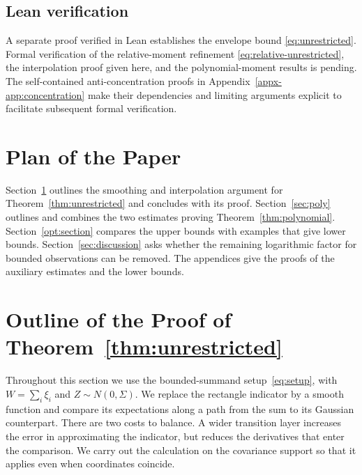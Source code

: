 \documentclass[11pt,letterpaper]{article}
\theoremstyle{remark}
\begin{document}
\subsection{Lean verification}\label{sec:lean-introduction}
A separate proof verified in Lean establishes the envelope bound \eqref{eq:unrestricted}. Formal verification of the relative-moment refinement \eqref{eq:relative-unrestricted}, the interpolation proof given here, and the polynomial-moment results is pending.
The self-contained anti-concentration proofs in
Appendix~\ref{appx-app:concentration} make their dependencies and limiting
arguments explicit to facilitate subsequent formal verification.

\section*{Plan of the Paper}
Section~\ref{sec:smoothing} outlines the smoothing and interpolation
argument for Theorem~\ref{thm:unrestricted} and concludes with its proof.
Section~\ref{sec:poly} outlines and combines the two estimates proving
Theorem~\ref{thm:polynomial}.
Section~\ref{opt:section} compares the upper bounds with examples that
give lower bounds. Section~\ref{sec:discussion} asks whether the remaining
logarithmic factor for bounded observations can be removed. The appendices
give the proofs of the auxiliary estimates and the lower bounds.

\section{Outline of the Proof of Theorem~\ref*{thm:unrestricted}}\label{sec:smoothing}
Throughout this section we use the bounded-summand setup~\eqref{eq:setup},
with \(W=\sum_i\xi_i\) and \(Z\sim N(0,\Sigma)\).
We replace the rectangle indicator by a smooth function and compare its
expectations along a path from the sum to its Gaussian counterpart.
There are two costs to balance. A wider transition layer increases the
error in approximating the indicator, but reduces the derivatives that
enter the comparison. We carry out the calculation on the covariance
support so that it applies even when coordinates coincide.
\end{document}

